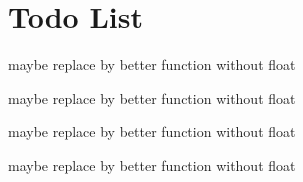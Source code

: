 \chapter{Todo List}
\hypertarget{todo}{}\label{todo}

\begin{DoxyRefList}
\item[Member \doxylink{class_d_w1000_time_a797e26db462579718c6ddcbb18a8517d}{DW1000\+Time\+::DW1000\+Time} (float time\+Us)]\label{todo__todo000001}%
%
maybe replace by better function without float  
\item[Member \doxylink{class_d_w1000_time_a05ae88f495a8121db77fcc4925670fdf}{DW1000\+Time\+::DW1000\+Time} (int32\+\_\+t value, float factor\+Us)]\label{todo__todo000002}%
%
maybe replace by better function without float  
\item[Member \doxylink{class_d_w1000_time_a743897a44c46369ca749bd52ca259db7}{DW1000\+Time\+::set\+Time} (float time\+Us)]\label{todo__todo000003}%
%
maybe replace by better function without float  
\item[Member \doxylink{class_d_w1000_time_a04eed725e24db998faf8ac5a96bbce9e}{DW1000\+Time\+::set\+Time} (int32\+\_\+t value, float factor\+Us)]\label{todo__todo000004}%
%
maybe replace by better function without float 
\end{DoxyRefList}